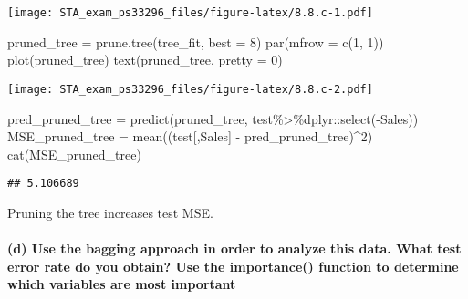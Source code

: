 \documentclass[
]{article}
\newenvironment{Shaded}{\begin{snugshade}}{\end{snugshade}}
\newcommand{\AttributeTok}[1]{\textcolor[rgb]{0.77,0.63,0.00}{#1}}
\newcommand{\DecValTok}[1]{\textcolor[rgb]{0.00,0.00,0.81}{#1}}
\newcommand{\FunctionTok}[1]{\textcolor[rgb]{0.00,0.00,0.00}{#1}}
\newcommand{\NormalTok}[1]{#1}
\newcommand{\OtherTok}[1]{\textcolor[rgb]{0.56,0.35,0.01}{#1}}
\newcommand{\SpecialCharTok}[1]{\textcolor[rgb]{0.00,0.00,0.00}{#1}}
\newcommand{\StringTok}[1]{\textcolor[rgb]{0.31,0.60,0.02}{#1}}
\begin{document}
\texttt{[image: STA\_exam\_ps33296\_files/figure-latex/8.8.c-1.pdf]}

\begin{Shaded}
\begin{Highlighting}[]
\NormalTok{pruned\_tree }\OtherTok{=} \FunctionTok{prune.tree}\NormalTok{(tree\_fit, }\AttributeTok{best =} \DecValTok{8}\NormalTok{)}
\FunctionTok{par}\NormalTok{(}\AttributeTok{mfrow =} \FunctionTok{c}\NormalTok{(}\DecValTok{1}\NormalTok{, }\DecValTok{1}\NormalTok{))}
\FunctionTok{plot}\NormalTok{(pruned\_tree)}
\FunctionTok{text}\NormalTok{(pruned\_tree, }\AttributeTok{pretty =} \DecValTok{0}\NormalTok{)}
\end{Highlighting}
\end{Shaded}

\texttt{[image: STA\_exam\_ps33296\_files/figure-latex/8.8.c-2.pdf]}

\begin{Shaded}
\begin{Highlighting}[]
\NormalTok{pred\_pruned\_tree }\OtherTok{=} \FunctionTok{predict}\NormalTok{(pruned\_tree, test}\SpecialCharTok{\%\textgreater{}\%}\NormalTok{dplyr}\SpecialCharTok{::}\FunctionTok{select}\NormalTok{(}\SpecialCharTok{{-}}\NormalTok{Sales))}
\NormalTok{MSE\_pruned\_tree }\OtherTok{=} \FunctionTok{mean}\NormalTok{((test[,}\StringTok{\textquotesingle{}Sales\textquotesingle{}}\NormalTok{] }\SpecialCharTok{{-}}\NormalTok{ pred\_pruned\_tree)}\SpecialCharTok{\^{}}\DecValTok{2}\NormalTok{)}
\FunctionTok{cat}\NormalTok{(MSE\_pruned\_tree)}
\end{Highlighting}
\end{Shaded}

\begin{verbatim}
## 5.106689
\end{verbatim}

Pruning the tree increases test MSE.

\hypertarget{d-use-the-bagging-approach-in-order-to-analyze-this-data.-what-test-error-rate-do-you-obtain-use-the-importance-function-to-determine-which-variables-are-most-important}{%
\paragraph{(d) Use the bagging approach in order to analyze this data.
What test error rate do you obtain? Use the importance() function to
determine which variables are most
important}\label{d-use-the-bagging-approach-in-order-to-analyze-this-data.-what-test-error-rate-do-you-obtain-use-the-importance-function-to-determine-which-variables-are-most-important}}
\end{document}
